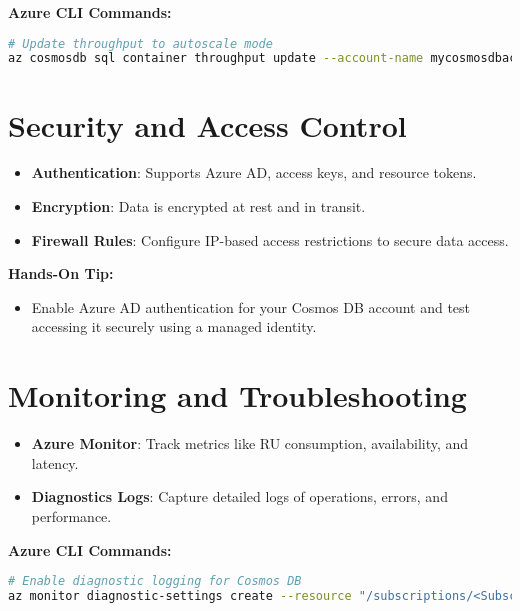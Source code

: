 \documentclass{article}
\begin{document}
\textbf{Azure CLI Commands:}
\begin{lstlisting}[language=bash]
# Update throughput to autoscale mode
az cosmosdb sql container throughput update --account-name mycosmosdbaccount --resource-group MyResourceGroup --database-name mydatabase --name mycontainer --max-throughput 4000
\end{lstlisting}

\section{Security and Access Control}
\begin{itemize}
    \item \textbf{Authentication}: Supports Azure AD, access keys, and resource tokens.
    \item \textbf{Encryption}: Data is encrypted at rest and in transit.
    \item \textbf{Firewall Rules}: Configure IP-based access restrictions to secure data access.
\end{itemize}

\textbf{Hands-On Tip:}
\begin{itemize}
    \item Enable Azure AD authentication for your Cosmos DB account and test accessing it securely using a managed identity.
\end{itemize}

\section{Monitoring and Troubleshooting}
\begin{itemize}
    \item \textbf{Azure Monitor}: Track metrics like RU consumption, availability, and latency.
    \item \textbf{Diagnostics Logs}: Capture detailed logs of operations, errors, and performance.
\end{itemize}

\textbf{Azure CLI Commands:}
\begin{lstlisting}[language=bash]
# Enable diagnostic logging for Cosmos DB
az monitor diagnostic-settings create --resource "/subscriptions/<SubscriptionID>/resourceGroups/MyResourceGroup/providers/Microsoft.DocumentDB/databaseAccounts/mycosmosdbaccount" --name MyDiagnostics --logs '[{"category": "MongoRequests","enabled": true}]'
\end{lstlisting}
\end{document}
